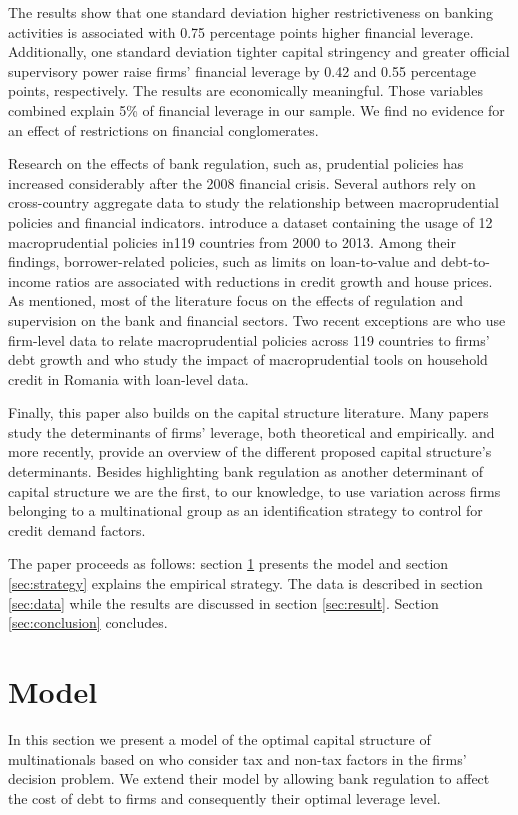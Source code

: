 \documentclass[12pt]{article}
\begin{document}
	The results show that one standard deviation higher restrictiveness on banking activities is associated with 0.75 percentage points higher financial leverage. Additionally, one standard deviation tighter capital stringency and greater official supervisory power raise firms' financial leverage by 0.42 and 0.55 percentage points, respectively. The results are economically meaningful. Those variables combined explain 5\% of financial leverage in our sample. We find no evidence for an effect of restrictions on financial conglomerates.
	
	Research on the effects of bank regulation, such as, prudential policies has increased considerably after the 2008 financial crisis. Several authors rely on cross-country aggregate data to study the relationship between macroprudential policies and financial indicators. \cite*{cerutti2017use} introduce a dataset containing the usage of 12 macroprudential policies in119 countries from 2000 to 2013. Among their findings, borrower-related policies, such as limits on loan-to-value and debt-to-income ratios are associated with reductions in credit growth and house prices. As mentioned, most of the literature focus on the effects of regulation and supervision on the bank and financial sectors. Two recent exceptions are \cite*{ayyagari2017credit} who use firm-level data to relate macroprudential policies across 119 countries to firms' debt growth and \cite*{epure2017household} who study the impact of macroprudential tools on household credit in Romania with loan-level data.
	
	Finally, this paper also builds on the capital structure literature. Many papers study the determinants of firms' leverage, both theoretical and empirically. \cite*{titman1988determinants} and more recently, \cite*{oztekin2015capital} provide an overview of the different proposed capital structure's determinants. Besides highlighting bank regulation as another determinant of capital structure we are the first, to our knowledge, to use variation across firms belonging to a multinational group as an identification strategy to control for credit demand factors.
	
	The paper proceeds as follows: section \ref{sec:model} presents the model and section \ref{sec:strategy} explains the empirical strategy. The data is described in section \ref{sec:data} while the results are discussed in section \ref{sec:result}. Section \ref{sec:conclusion} concludes.
	
		\section{Model} \label{sec:model}
	In this section we present a model of the optimal capital structure of multinationals based on \cite{huizinga2008capital} who consider tax and non-tax factors in the firms' decision problem. We extend their model by allowing bank regulation to affect the cost of debt to firms and consequently their optimal leverage level.
	
\end{document}
